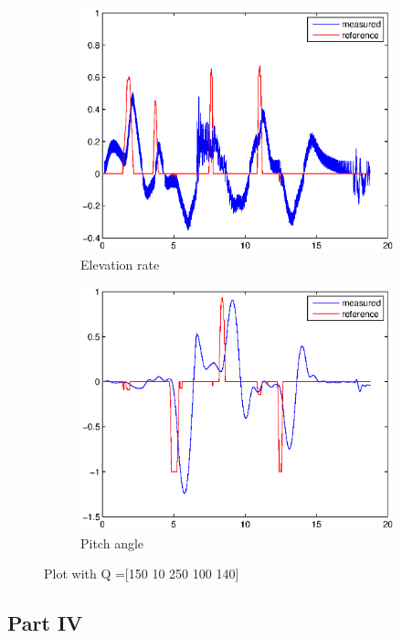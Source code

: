 \begin{figure}[H]
\graphicspath{ {Part3_pictures/}}
\begin{subfigure}{0.5\textwidth}
    \includegraphics[width=0.9\linewidth]{Part3_pictures/p3p3/Q4elevation.eps} 
    \caption{Elevation rate}
\end{subfigure}
\begin{subfigure}{0.5\textwidth}
    \includegraphics[width=0.9\linewidth]{Part3_pictures/p3p3/Q4pitch.eps}
    \caption{Pitch angle}
\end{subfigure}
\caption{Plot with Q =[150 10 250 100 140]}
\end{figure}
\newpage



\subsection{Part IV}
